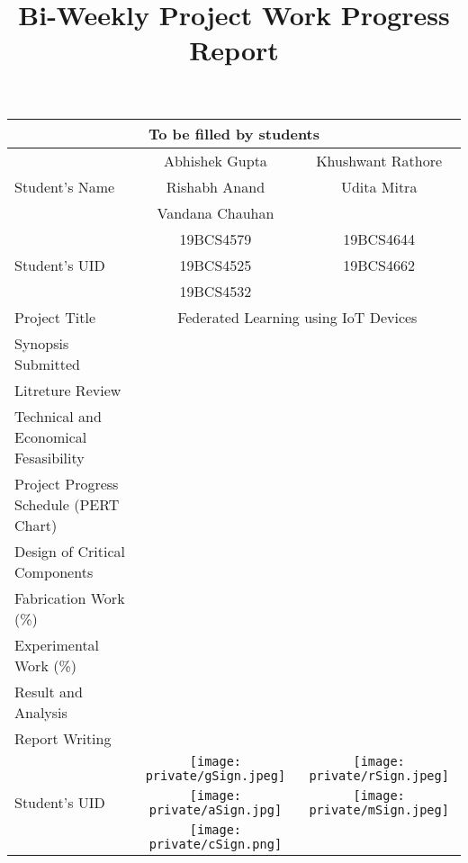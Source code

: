 \documentclass[14pt]{extarticle}
\title{\vspace{-3ex}Bi-Weekly Project Work Progress Report\vspace{-5ex}}
\author{}
\date{}
\begin{document}
\maketitle
\vspace{-2em}

\begin{center}
    
    \begin{tabular}{|l|cc|}
        \hline
        \multicolumn{3}{|c|}{To be filled by students} \\    
        \hline
        \multirow{3}{*}{Student's Name} & Abhishek Gupta & Khushwant Rathore\\
        & Rishabh Anand & Udita Mitra\\
        & Vandana Chauhan & \\
        \hline
        \multirow{3}{*}{Student's UID} & 19BCS4579 & 19BCS4644\\
        & 19BCS4525 & 19BCS4662\\
        & 19BCS4532 & \\
        \hline
        Project Title & \multicolumn{2}{|c|}{Federated Learning using IoT Devices} \\
        \hline
        Synopsis Submitted & \multicolumn{2}{|c|}{} \\
        \hline
        Litreture Review & \multicolumn{2}{|c|}{} \\
        \hline
        Technical and Economical Fesasibility & \multicolumn{2}{|c|}{} \\
        \hline
        Project Progress Schedule (PERT Chart) & \multicolumn{2}{|c|}{} \\
        \hline
        Design of Critical Components & \multicolumn{2}{|c|}{} \\
        \hline
        Fabrication Work (\%) & \multicolumn{2}{|c|}{} \\
        \hline
        Experimental Work  (\%) & \multicolumn{2}{|c|}{} \\
        \hline
        Result and Analysis & \multicolumn{2}{|c|}{} \\
        \hline
        Report Writing & \multicolumn{2}{|c|}{} \\
        \hline
        \multirow{5}{*}{Student's UID} & {\texttt{[image: private/gSign.jpeg]}} & {\texttt{[image: private/rSign.jpeg]}}\\
        & {\texttt{[image: private/aSign.jpg]}} & {\texttt{[image: private/mSign.jpeg]}} \\
        & {\texttt{[image: private/cSign.png]}} & \\
        \hline
    \end{tabular}

\end{center}
\end{document}
